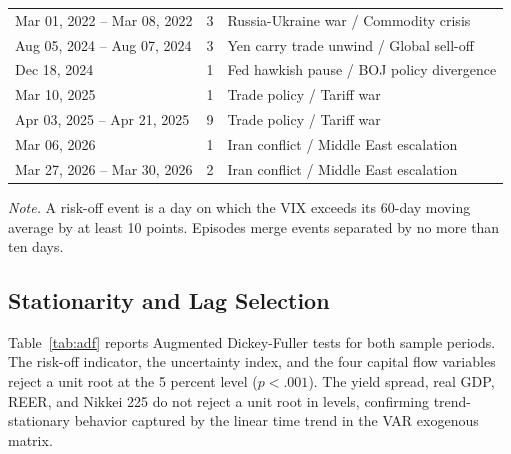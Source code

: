 \begin{table}[H]
\begin{tabular}{l r l}
Mar 01, 2022 -- Mar 08, 2022 & 3 & Russia-Ukraine war / Commodity crisis \\
Aug 05, 2024 -- Aug 07, 2024 & 3 & Yen carry trade unwind / Global sell-off \\
Dec 18, 2024 & 1 & Fed hawkish pause / BOJ policy divergence \\
Mar 10, 2025 & 1 & Trade policy / Tariff war \\
Apr 03, 2025 -- Apr 21, 2025 & 9 & Trade policy / Tariff war \\
Mar 06, 2026 & 1 & Iran conflict / Middle East escalation \\
Mar 27, 2026 -- Mar 30, 2026 & 2 & Iran conflict / Middle East escalation \\
    \bottomrule
  \end{tabular}
\end{table}

\begin{center}
  \small\textit{Note.} A risk-off event is a day on which the VIX exceeds its 60-day moving average by at least 10 points. Episodes merge events separated by no more than ten days.
\end{center}

\subsection{Stationarity and Lag Selection}

Table~\ref{tab:adf} reports Augmented Dickey-Fuller tests for both sample periods. The risk-off indicator, the uncertainty index, and the four capital flow variables reject a unit root at the 5 percent level ($p < .001$). The yield spread, real GDP, REER, and Nikkei 225 do not reject a unit root in levels, confirming trend-stationary behavior captured by the linear time trend in the VAR exogenous matrix.

